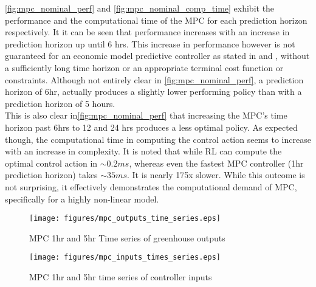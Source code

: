 \autoref{fig:mpc_nominal_perf} and \autoref{fig:mpc_nominal_comp_time} exhibit the performance and the computational time of the MPC for each prediction horizon respectively. It it can be seen that performance increases with an increase in prediction horizon up until 6 hrs. This increase in performance however is not guaranteed for an economic model predictive controller as stated in \cite{ellisTutorialReviewEconomic2014}  and \cite{amritEconomicOptimizationUsing2011}, without a sufficiently long time horizon or an appropriate terminal cost function or constraints. Although not entirely clear in \autoref{fig:mpc_nominal_perf}, a prediction horizon of 6hr, actually produces a slightly lower performing policy than with a prediction horizon of 5 hours. \\
This is also clear in\autoref{fig:mpc_nominal_perf} that increasing the MPC's time horizon past 6hrs to 12 and 24 hrs produces a less optimal policy. As expected though, the computational time in computing the control action seems to increase with an increase in complexity. It is noted that while RL can compute the optimal control action in $ \sim 0.2 ms$, whereas even the fastest MPC controller (1hr prediction horizon) takes $\sim 35 ms$. It is nearly 175x slower.  While this outcome is not surprising, it effectively demonstrates the computational demand of MPC, specifically for a highly non-linear model.

\begin{figure}[h]
	\centering
	\texttt{[image: figures/mpc\_outputs\_time\_series.eps]}
	\caption{MPC 1hr and 5hr Time series of greenhouse outputs}
	\label{fig:mpc-timeseries-outputs}
\end{figure}

\begin{figure}[h]
	\centering
	\texttt{[image: figures/mpc\_inputs\_times\_series.eps]}
	\caption{MPC 1hr and 5hr time series of controller inputs}
	\label{fig:mpc-timeseries-inputs}
\end{figure}

